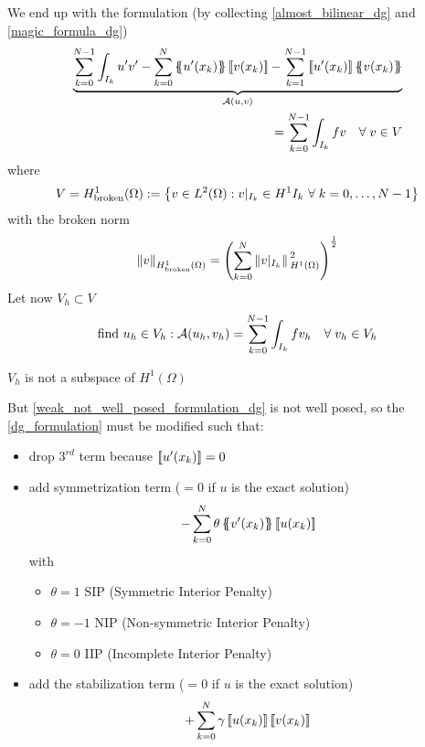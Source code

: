 We end up with the formulation (by collecting \eqref{almost_bilinear_dg} and \eqref{magic_formula_dg})
\begin{equation}
    \begin{split}
        \underbrace{\sum_{k=0}^{N-1}\int_{I_k} u'v' - \sum_{k=0}^{N} \average{u'(x_k)}\jump{v(x_k)} - \sum_{k=1}^{N-1} \jump{u'(x_k)}\average{v(x_k)}}_{\mathcal{A}(u,v)} \\
        = \sum_{k=0}^{N-1}\int_{I_k} fv \quad \forall \; v \in V \label{dg_formulation}
    \end{split}
\end{equation}
where 
\[
    V = H^1_{\text{broken}}(\Omega) := \left\{ v \in L^2(\Omega) : v\vert_{I_k} \in H^1{I_k} \ \forall \; k = 0,\ldots, N-1 \right\}
\]
with the broken norm 
\[
    \norm{v}_{H^1_{\text{broken}}(\Omega)} = \left( \sum_{k=0}^{N} \norm*{v\vert_{I_k}}_{H^1(\Omega)}^2 \right)^{\frac{1}{2}}
\]
Let now \(V_h \subset V\)
\begin{equation}
    \text{find } u_h \in V_h : \mathcal{A}(u_h, v_h) = \sum_{k=0}^{N-1} \int_{I_k} fv_h \quad \forall \; v_h \in V_h \label{weak_not_well_posed_formulation_dg}
\end{equation}
\begin{remark}
    \(V_h\) is not a subspace of \(H^1(\Omega)\)
\end{remark}
But \eqref{weak_not_well_posed_formulation_dg} is not well posed, so the \eqref{dg_formulation} must be modified such that:
\begin{itemize}
    \item drop \(3^{rd}\) term because \(\left[\!\left[u'(x_k)\right]\!\right] = 0\)
    \item add symmetrization term (\(=0\) if \(u\) is the exact solution) 
    \[
        -\sum_{k=0}^{N} \theta \left\{\!\!\left\{v'(x_k)\right\}\!\!\right\}\left[\!\left[u(x_k)\right]\!\right]
    \]
    with
    \begin{itemize}
        \item[\qedhere] \(\theta = 1\) SIP (Symmetric Interior Penalty)
        \item[\qedhere] \(\theta = -1\) NIP (Non-symmetric Interior Penalty)
        \item[\qedhere] \(\theta = 0\) IIP (Incomplete Interior Penalty)
    \end{itemize}
    \item add the stabilization term (\(=0\) if \(u\) is the exact solution)
    \[
        +\sum_{k=0}^{N} \gamma \left[\!\left[u(x_k)\right]\!\right]\left[\!\left[v(x_k)\right]\!\right]
    \]
\end{itemize}